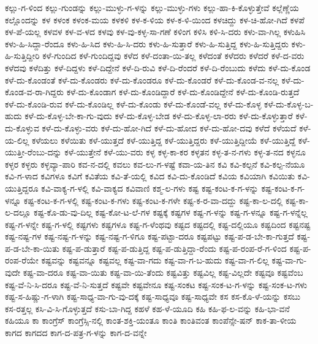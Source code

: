 {ಕಲ್ಲು-ಗ-ಳಿಂದ
ಕಲ್ಲು-ಗುಂಡನ್ನು
ಕಲ್ಲು-ಮುಳ್ಳು-ಗ-ಳನ್ನು
ಕಲ್ಲು-ಮುಳ್ಳು-ಗಳು
ಕಲ್ಲು-ಹಾ-ಕಿ-ಕೊಳ್ಳುತ್ತೇವೆ
ಕಲ್ಲೆಣ್ಣೆಯ
ಕಲ್ಲೊಂದನ್ನು
ಕಳ
ಕಳಂಕ
ಕಳಂಕ-ಮಯ
ಕಳಕಳಿ
ಕಳ-ಕ-ಳಿಯ
ಕಳ-ಕ-ಳಿ-ಯಿಂದ
ಕಳಚಿದ್ದು
ಕಳ-ಚಿ-ಹೋ-ಗಿದೆ
ಕಳಪೆ
ಕಳ-ಪೆ-ಯಲ್ಲ
ಕಳವಳ
ಕಳ-ವ-ಳದ
ಕಳವು
ಕಳ-ವು-ಕಳ್ಳ-ಸಾ-ಗಣೆ
ಕಳಿಂಗ
ಕಳಿಸಿ
ಕಳಿ-ಸಿ-ದರು
ಕಳು-ವಾ-ಗಿಲ್ಲ
ಕಳುಹಿಸಿ
ಕಳು-ಹಿ-ಸಿದ್ದಾ-ರೆಂದೂ
ಕಳು-ಹಿ-ಸಿದ
ಕಳು-ಹಿ-ಸಿ-ದರು
ಕಳು-ಹಿ-ಸುತ್ತಾರೆ
ಕಳು-ಹಿ-ಸುತ್ತಿದ್ದ
ಕಳು-ಹಿ-ಸುತ್ತಿದ್ದರು
ಕಳು-ಹಿ-ಸುತ್ತಿದ್ದೀರಿ
ಕಳೆ-ಗುಂದಿದ
ಕಳೆ-ಗುಂದಿದ್ದವು
ಕಳೆದ
ಕಳೆ-ದಂತಾ-ಯಿ-ತಲ್ಲ
ಕಳೆದಂತೆ
ಕಳೆದರು
ಕಳೆದರೆ
ಕಳೆ-ದ-ವರು
ಕಳೆದವು
ಕಳೆದಿತ್ತು
ಕಳೆ-ದಿದ್ದಳು
ಕಳೆ-ದಿದ್ದೇನೆ
ಕಳೆ-ದಿ-ರುವಿ
ಕಳೆ-ದಿ-ರೆಂದರೆ
ಕಳೆ-ದಿ-ರೆಂಬುದು
ಕಳೆದು
ಕಳೆ-ದು-ಕೊಂಡ
ಕಳೆ-ದು-ಕೊಂಡಂತೆ
ಕಳೆ-ದು-ಕೊಂಡರು
ಕಳೆ-ದು-ಕೊಂಡರೂ
ಕಳೆ-ದು-ಕೊಂಡರೆ
ಕಳೆ-ದು-ಕೊಂಡ-ವ-ನಲ್ಲ
ಕಳೆ-ದು-ಕೊಂಡ-ವ-ರಾ-ಗಿದ್ದರು
ಕಳೆ-ದು-ಕೊಂಡಾಗ
ಕಳೆ-ದು-ಕೊಂಡಿದ್ದಾರೆ
ಕಳೆ-ದು-ಕೊಂಡಿದ್ದೇನೆ
ಕಳೆ-ದು-ಕೊಂಡಿ-ರುತ್ತದೆ
ಕಳೆ-ದು-ಕೊಂಡಿ-ರುವ
ಕಳೆ-ದು-ಕೊಂಡಿಲ್ಲ
ಕಳೆ-ದು-ಕೊಂಡು
ಕಳೆ-ದು-ಕೊಂಡೆ-ವಲ್ಲ
ಕಳೆ-ದು-ಕೊಳ್ಳ
ಕಳೆ-ದು-ಕೊಳ್ಳ-ಬ-ಹುದು
ಕಳೆ-ದು-ಕೊಳ್ಳ-ಬೇ-ಕಾ-ಗು-ವುದು
ಕಳೆ-ದು-ಕೊಳ್ಳ-ಬೇಡ
ಕಳೆ-ದು-ಕೊಳ್ಳ-ಲಾ-ರರು
ಕಳೆ-ದು-ಕೊಳ್ಳುತ್ತಾರೆ
ಕಳೆ-ದು-ಕೊಳ್ಳುವ
ಕಳೆ-ದು-ಕೊಳ್ಳು-ವರು
ಕಳೆ-ದು-ಹೋ-ಗಿದೆ
ಕಳೆ-ದು-ಹೋದ
ಕಳೆ-ದು-ಹೋ-ದವು
ಕಳೆದೆ
ಕಳೆಯದೆ
ಕಳೆ-ಯ-ಲಿಲ್ಲ
ಕಳೆಯಲು
ಕಳೆಯಿತು
ಕಳೆ-ಯುತ್ತದೆ
ಕಳೆ-ಯುತ್ತಿದ್ದ
ಕಳೆ-ಯುತ್ತಿದ್ದರು
ಕಳೆ-ಯುತ್ತಿದ್ದೀಯೆ
ಕಳೆ-ಯುತ್ತಿದ್ದೆ
ಕಳೆ-ಯುತ್ತೀ-ರೆಂಬು-ದನ್ನು
ಕಳೆ-ಯುತ್ತೇನೆ
ಕಳೆ-ಯು-ವರು
ಕಳ್ಳ
ಕಳ್ಳ-ಕಾ-ಕರ
ಕಳ್ಳತನ
ಕಳ್ಳ-ತ-ನ-ಗಳು
ಕಳ್ಳ-ತ-ನದ
ಕಳ್ಳನೂ
ಕಳ್ಳರ
ಕಳ್ಳರು
ಕಳ್ಳವ್ಯಾ-ಪಾರಿ
ಕವ-ನ-ದಲ್ಲಿ
ಕವಲು
ಕವ-ಲು-ಗ-ಳಷ್ಟೆ
ಕವಾ-ಯ-ತಿನ
ಕವಿ
ಕವಿ-ಕಲ್ಪನೆ
ಕವಿ-ಕಲ್ಪ-ನೆಯೂ
ಕವಿ-ಗ-ಳಾದ
ಕವಿಗಳೂ
ಕವಿಗೆ
ಕವಿತೆಯ
ಕವಿ-ತೆ-ಯಲ್ಲಿ
ಕವಿದ
ಕವಿ-ದು-ಕೊಂಡಿದೆ
ಕವಿಯ
ಕವಿಯಾಗಿ
ಕವಿಯಿತು
ಕವಿ-ಯುತ್ತಿದ್ದರೂ
ಕವಿ-ವಾಕ್ಯ-ಗ-ಳಲ್ಲಿ
ಕವಿ-ವಾಕ್ಯದ
ಕವಿವಾಣಿ
ಕಶ್ಮ-ಲ-ಗಳು
ಕಷ್ಟ
ಕಷ್ಟ-ಕಂಟ-ಕ-ಗ-ಳನ್ನು
ಕಷ್ಟ-ಕಂಟ-ಕ-ಗ-ಳನ್ನೂ
ಕಷ್ಟ-ಕಂಟ-ಕ-ಗ-ಳಲ್ಲಿ
ಕಷ್ಟ-ಕಂಟ-ಕ-ಗಳು
ಕಷ್ಟ-ಕಂಟ-ಕ-ಗಳೇ
ಕಷ್ಟ-ಕ-ರ-ವಾ-ದದ್ದು
ಕಷ್ಟ-ಕಾ-ಲ-ದಲ್ಲಿ
ಕಷ್ಟ-ಕಾ-ಲ-ದಲ್ಲೂ
ಕಷ್ಟ-ಕೊ-ಡು-ವು-ದಿಲ್ಲ
ಕಷ್ಟ-ಕೋ-ಟ-ಲೆ-ಗಳ
ಕಷ್ಟಕ್ಕೆ
ಕಷ್ಟಗಳ
ಕಷ್ಟ-ಗ-ಳನ್ನು
ಕಷ್ಟ-ಗ-ಳನ್ನೂ
ಕಷ್ಟ-ಗ-ಳನ್ನೆಲ್ಲ
ಕಷ್ಟ-ಗ-ಳನ್ನೇ
ಕಷ್ಟ-ಗ-ಳಲ್ಲಿ
ಕಷ್ಟಗಳು
ಕಷ್ಟಗಳೂ
ಕಷ್ಟ-ಗ-ಳೆಂಥವು
ಕಷ್ಟದ
ಕಷ್ಟದಲ್ಲಿ
ಕಷ್ಟ-ದಲ್ಲಿಯೂ
ಕಷ್ಟದಿಂದ
ಕಷ್ಟನಷ್ಟ
ಕಷ್ಟ-ನಷ್ಟ-ಗಳ
ಕಷ್ಟ-ನಷ್ಟ-ಗ-ಳನ್ನು
ಕಷ್ಟ-ನಷ್ಟ-ಗ-ಳಿಗೂ
ಕಷ್ಟ-ಪಟ್ಟಾ-ದರೂ
ಕಷ್ಟಪಟ್ಟು
ಕಷ್ಟ-ಪ-ಡ-ಬೇ-ಕಾ-ಗುತ್ತದೆ
ಕಷ್ಟ-ಪ-ಡ-ಬೇ-ಕಾ-ಯಿತು
ಕಷ್ಟ-ಪ-ಡುತ್ತಾರೆ
ಕಷ್ಟ-ಪ-ಡುತ್ತಿದ್ದ
ಕಷ್ಟ-ಪ-ಡುತ್ತಿದ್ದಾ-ರೆಂದು
ಕಷ್ಟ-ಪ-ರಂಪ-ರೆ-ಗ-ಳಿಂದ
ಕಷ್ಟ-ಪ-ರಂಪ-ರೆಯೇ
ಕಷ್ಟವನ್ನು
ಕಷ್ಟವನ್ನೂ
ಕಷ್ಟವಲ್ಲ
ಕಷ್ಟ-ವಾ-ಗದು
ಕಷ್ಟ-ವಾ-ಗ-ಬ-ಹುದು
ಕಷ್ಟ-ವಾ-ಗ-ಲಿಲ್ಲ
ಕಷ್ಟ-ವಾ-ಗು-ವುದೇ
ಕಷ್ಟ-ವಾ-ದರೂ
ಕಷ್ಟ-ವಾ-ಯಿತು
ಕಷ್ಟ-ವಾ-ಯಿ-ತೆಂದು
ಕಷ್ಟವಿತ್ತು
ಕಷ್ಟವಿಲ್ಲ
ಕಷ್ಟ-ವಿಲ್ಲದೇ
ಕಷ್ಟವೂ
ಕಷ್ಟವೆಂಬ
ಕಷ್ಟ-ವೆ-ನಿ-ಸಿ-ದರೂ
ಕಷ್ಟ-ವೆ-ನಿ-ಸುತ್ತದೆ
ಕಷ್ಟವೇ
ಕಷ್ಟವೇನೂ
ಕಷ್ಟ-ಸಂಕಟ
ಕಷ್ಟ-ಸಂಕ-ಟ-ಗ-ಳನ್ನು
ಕಷ್ಟ-ಸಂಕ-ಟ-ಗಳು
ಕಷ್ಟ-ಸ-ಹಿಷ್ಣು-ಗ-ಳಾಗಿ
ಕಷ್ಟ-ಸಾಧ್ಯ-ವಾ-ಗು-ವು-ದಕ್ಕೆ
ಕಷ್ಟ-ಸಾಧ್ಯವೂ
ಕಷ್ಟ-ಸಾಧ್ಯವೇ
ಕಸ
ಕಸ-ಕೊ-ಳೆ-ಯನ್ನು
ಕಸಬು
ಕಸ-ರತ್ತಲ್ಲ
ಕಸಿ-ವಿ-ಸಿ-ಗೊಳ್ಳುತ್ತದೆ
ಕಸು-ಬಾ-ಗಿದ್ದ
ಕಹಳೆ
ಕಹ-ಳೆ-ಯೂದಿ
ಕಹಿ
ಕಹಿ-ಫ-ಲ-ವನ್ನು
ಕಹಿ-ಭಾ-ವನೆ
ಕಹಿಯೂ
ಕಾ
ಕಾಂಗ್ರೆಸ್
ಕಾಂಗ್ರೆಸ್ಸಿ-ನಲ್ಲಿ
ಕಾಂತ-ಶಕ್ತಿ-ಯಂತೂ
ಕಾಂತಿ
ಕಾಂತಿವಂತ
ಕಾಂಪೆನ್ಸೇ-ಷನ್
ಕಾಕ-ತಾ-ಳೀಯ
ಕಾಗದ
ಕಾಗದದ
ಕಾಗ-ದ-ಪತ್ರ-ಗ-ಳನ್ನು
ಕಾಗ-ದ-ವನ್ನೇ
}
